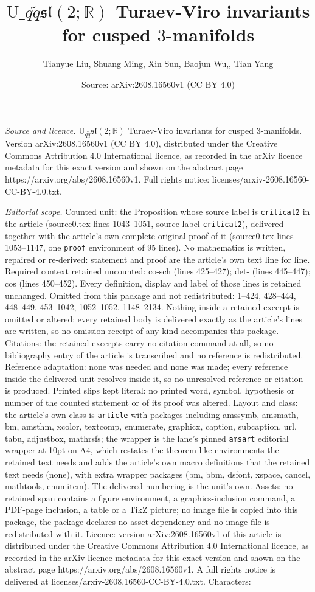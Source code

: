 \documentclass[10pt,a4paper]{amsart}
\title[$\mathrm {U}\_{q\tilde q}\mathfrak{sl}(2;\mathbb R)$ Turaev-V]{$\mathrm {U}\_{q\tilde q}\mathfrak{sl}(2;\mathbb R)$ Turaev-Viro invariants for cusped $3$-manifolds}
\author{Tianyue Liu, Shuang Ming, Xin Sun, Baojun Wu,, Tian Yang}
\date{Source: arXiv:2608.16560v1 (CC BY 4.0)}
\begin{document}
\maketitle

\noindent\emph{Source and licence.} $\mathrm {U}_{q\tilde q}\mathfrak{sl}(2;\mathbb R)$ Turaev-Viro invariants for cusped $3$-manifolds. Version arXiv:2608.16560v1 (CC BY 4.0), distributed under the Creative Commons Attribution 4.0 International licence, as recorded in the arXiv licence metadata for this exact version and shown on the abstract page https://arxiv.org/abs/2608.16560v1. Full rights notice: licenses/arxiv-2608.16560-CC-BY-4.0.txt.\par\smallskip

\noindent\textit{Editorial scope.} Counted unit: the Proposition whose source label is \texttt{critical2} in the article (source0.tex lines 1043--1051, source label \texttt{critical2}), delivered together with the article's own complete original proof of it (source0.tex lines 1053--1147, one \texttt{proof} environment of 95 lines). No mathematics is written, repaired or re-derived: statement and proof are the article's own text line for line. Required context retained uncounted: co-sch (lines 425--427); det- (lines 445--447); cos (lines 450--452). Every definition, display and label of those lines is retained unchanged. Omitted from this package and not redistributed: 1--424, 428--444, 448--449, 453--1042, 1052--1052, 1148--2134. Nothing inside a retained excerpt is omitted or altered: every retained body is delivered exactly as the article's lines are written, so no omission receipt of any kind accompanies this package. Citations: the retained excerpts carry no citation command at all, so no bibliography entry of the article is transcribed and no reference is redistributed. Reference adaptation: none was needed and none was made; every reference inside the delivered unit resolves inside it, so no unresolved reference or citation is produced. Printed slips kept literal: no printed word, symbol, hypothesis or number of the counted statement or of its proof was altered. Layout and class: the article's own class is \texttt{article} with packages including amssymb, amsmath, bm, amsthm, xcolor, textcomp, enumerate, graphicx, caption, subcaption, url, tabu, adjustbox, mathrsfs; the wrapper is the lane's pinned \texttt{amsart} editorial wrapper at 10pt on A4, which restates the theorem-like environments the retained text needs and adds the article's own macro definitions that the retained text needs (none), with extra wrapper packages (bm, bbm, dsfont, xspace, cancel, mathtools, enumitem). The delivered numbering is the unit's own. Assets: no retained span contains a figure environment, a graphics-inclusion command, a PDF-page inclusion, a table or a TikZ picture; no image file is copied into this package, the package declares no asset dependency and no image file is redistributed with it. Licence: version arXiv:2608.16560v1 of this article is distributed under the Creative Commons Attribution 4.0 International licence, as recorded in the arXiv licence metadata for this exact version and shown on the abstract page https://arxiv.org/abs/2608.16560v1. A full rights notice is delivered at licenses/arxiv-2608.16560-CC-BY-4.0.txt. Characters: 
\end{document}
